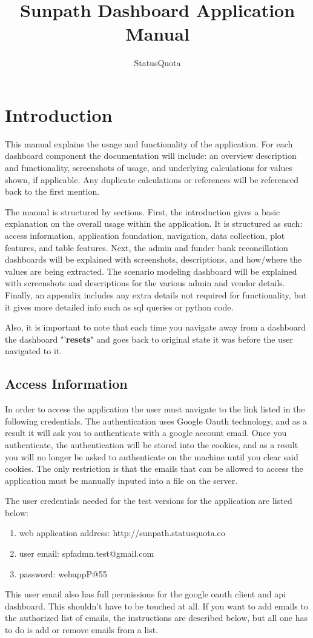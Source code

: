 \documentclass[titlepage]{article}
\author{StatusQuota}
\title{Sunpath Dashboard Application Manual}
\begin{document}
\maketitle
\tableofcontents
\newpage
\section{Introduction}
This manual explains the usage and functionality of the application. For each dashboard component the documentation will include: an overview description and functionality, screenshots of usage, and underlying calculations for values shown, if applicable. Any duplicate calculations or references will be referenced back to the first mention. 

The manual is structured by sections. First, the introduction gives a basic explanation on the overall usage within the application. It is structured as such: access information, application foundation, navigation, data collection, plot features, and table features. Next, the admin and funder bank reconcillation dashboards will be explained with screenshots, descriptions, and how/where the values are being extracted. The scenario modeling dashboard will be explained with screenshots and descriptions for the various admin and vendor details. Finally, an appendix includes any extra details not required for functionality, but it gives more detailed info such as sql queries or python code. 

Also, it is important to note that each time you navigate away from a dashboard the dashboard "'\textbf{resets}" and goes back to original state it was before the user navigated to it. 

\subsection{Access Information}
In order to access the application the user must navigate to the link listed in the following credentials.  The authentication uses Google Oauth technology, and as a result it will ask you to authenticate with a google account email. Once you authenticate, the authentication will be stored into the cookies, and as a result you will no longer be asked to authenticate on the machine until you clear said cookies. The only restriction is that the emails that can be allowed to access the application must be manually inputed into a file on the server. 

The user credentials needed for the test versions for the application are listed below: 
\begin{enumerate}
	\item web application address: http://sunpath.statusquota.co
	\item user email: spfadmn.test@gmail.com
	\item password: webappP@55
\end{enumerate}
This user email also has full permissions for the google oauth client and api dashboard. This shouldn't have to be touched at all. If you want to add emails to the authorized list of emails, the instructions are described below, but all one has to do is add or remove emails from a list. 
\newpage
\end{document}
